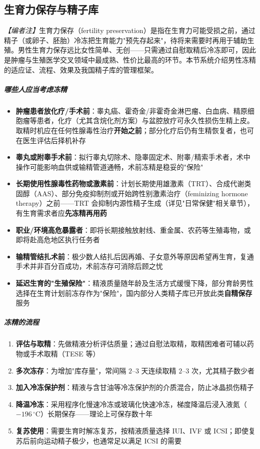 \documentclass[12pt,a4paper,twoside]{ctexbook}
\begin{document}
\subsection{生育力保存与精子库}

\noindent\textit{【编者注】}生育力保存（fertility preservation）是指在生育力可能受损之前，通过精子（或卵子、胚胎）冷冻把生育能力"预先存起来"，待将来需要时再用于辅助生殖。男性生育力保存远比女性简单、无创——只需通过自慰取精后冷冻即可，因此是肿瘤与生殖医学交叉领域中最成熟、性价比最高的环节。本节系统介绍男性冻精的适应证、流程、效果及我国精子库的管理框架。

\subparagraph{哪些人应当考虑冻精}

\begin{itemize}
	\item \textbf{肿瘤患者放化疗/手术前}：睾丸癌、霍奇金/非霍奇金淋巴瘤、白血病、精原细胞瘤等患者，化疗（尤其含烷化剂方案）与盆腔放疗可永久性损伤生精上皮。取精时机应在任何性腺毒性治疗\textbf{开始之前}；部分化疗后仍有生精恢复者，也可在医生评估后择机补存
	\item \textbf{睾丸或附睾手术前}：拟行睾丸切除术、隐睾固定术、附睾/精索手术者，术中操作可能影响血供或输精管道通畅，术前冻精是稳妥的"保险"
	\item \textbf{长期使用性腺毒性药物或激素前}：计划长期使用雄激素（TRT）、合成代谢类固醇（AAS）、部分免疫抑制剂或开始跨性别激素治疗（feminizing hormone therapy）之前——TRT 会抑制内源性精子生成（详见"日常保健"相关章节），有生育需求者应\textbf{先冻精再用药}
	\item \textbf{职业/环境高危暴露者}：即将长期接触放射线、重金属、农药等生殖毒物，或即将赴高危地区执行任务者
	\item \textbf{输精管结扎术前}：极少数人结扎后因再婚、子女意外等原因希望再生育，复通手术并非百分百成功，术前冻存可消除后顾之忧
	\item \textbf{延迟生育的"生殖保险"}：精液质量随年龄及生活方式缓慢下降，部分育龄男性选择在生育计划前冻存作为"保险"，国内部分人类精子库已开放此类\textbf{自精保存}服务
\end{itemize}

\subparagraph{冻精的流程}

\begin{enumerate}
	\item \textbf{评估与取精}：先做精液分析评估质量；通过自慰法取精，取精困难者可辅以药物或手术取精（TESE 等）
	\item \textbf{多次冻存}：为增加"库存量"，常间隔 $2$--$3$ 天连续取精 $2$--$3$ 次，尤其精子数少者
	\item \textbf{加入冷冻保护剂}：精液与含甘油等冷冻保护剂的介质混合，防止冰晶损伤精子
	\item \textbf{降温冷冻}：采用程序化慢速冷冻或玻璃化快速冷冻，梯度降温后浸入液氮（$-196\,^{\circ}\mathrm{C}$）长期保存——理论上可保存数十年
	\item \textbf{复苏使用}：需要生育时解冻复苏，按精液质量选择 IUI、IVF 或 ICSI；即使复苏后前向运动精子极少，也通常足以满足 ICSI 的需要
\end{enumerate}
\end{document}
